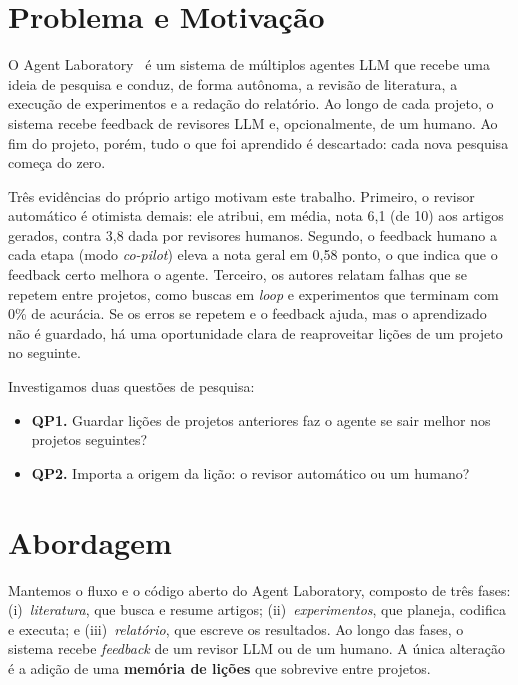 
\maketitle

\section{Problema e Motivação}

O Agent Laboratory~\cite{schmidgall2025agentlab} é um sistema de múltiplos
agentes LLM que recebe uma ideia de pesquisa e conduz, de forma autônoma, a
revisão de literatura, a execução de experimentos e a redação do relatório.
Ao longo de cada projeto, o sistema recebe feedback de revisores LLM e,
opcionalmente, de um humano. Ao fim do projeto, porém, tudo o que foi
aprendido é descartado: cada nova pesquisa começa do zero.

Três evidências do próprio artigo motivam este trabalho. Primeiro, o
revisor automático é otimista demais: ele atribui, em média, nota 6,1 (de 10)
aos artigos gerados, contra 3,8 dada por revisores humanos. Segundo, o
feedback humano a cada etapa (modo \emph{co-pilot}) eleva a nota geral em
0,58 ponto, o que indica que o feedback certo melhora o agente. Terceiro, os
autores relatam falhas que se repetem entre projetos, como buscas em
\emph{loop} e experimentos que terminam com 0\% de acurácia. Se os erros se
repetem e o feedback ajuda, mas o aprendizado não é guardado, há uma
oportunidade clara de reaproveitar lições de um projeto no seguinte.

Investigamos duas questões de pesquisa:
\begin{itemize}
  \item \textbf{QP1.} Guardar lições de projetos anteriores faz o agente se
        sair melhor nos projetos seguintes?
  \item \textbf{QP2.} Importa a origem da lição: o revisor automático ou um
        humano?
\end{itemize}

\section{Abordagem}

Mantemos o fluxo e o código aberto do Agent Laboratory, composto de três
fases: (i)~\emph{literatura}, que busca e resume artigos;
(ii)~\emph{experimentos}, que planeja, codifica e executa; e
(iii)~\emph{relatório}, que escreve os resultados. Ao longo das fases, o
sistema recebe \emph{feedback} de um revisor LLM ou de um humano.
A única alteração é a adição de uma \textbf{memória de lições} que sobrevive
entre projetos.

